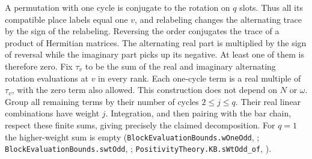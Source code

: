 A permutation with one cycle is conjugate to the rotation on $q$ slots.
Thus all its compatible place labels equal one $v$, and relabeling
changes the alternating trace by the sign of the relabeling. Reversing
the order conjugates the trace of a product of Hermitian matrices.
The alternating real part is multiplied by the sign of reversal while
the imaginary part picks up its negative. At least one of them is
therefore zero. Fix $\tau_v$ to be the sum of the real and imaginary
alternating rotation evaluations at $v$ in every rank. Each one-cycle
term is a real multiple of $\tau_v$, with the zero term also allowed.
This construction does not depend on $N$ or $\omega$. Group all remaining
terms by their number of cycles $2\le j\le q$. Their real linear
combinations have weight $j$. Integration, and then pairing with the
bar chain, respect these finite sums, giving precisely the claimed
decomposition. For $q=1$ the higher-weight sum is empty
(\nolinkurl{BlockEvaluationBounds.wOneOdd}, ;
\nolinkurl{BlockEvaluationBounds.swtOdd}, ;
\nolinkurl{PositivityTheory.KB.sWtOdd_of}, ).

